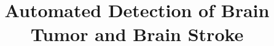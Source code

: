 \documentclass[conference]{IEEEtran}
\begin{document}
\title{Automated Detection of Brain Tumor and Brain Stroke}


\maketitle
\end{document}
